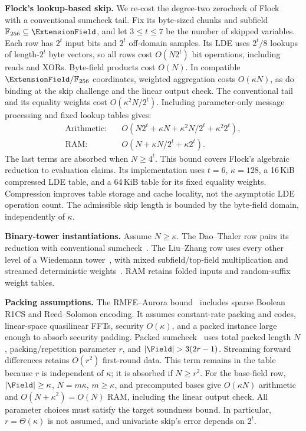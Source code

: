 \smallskip\noindent\textbf{Flock's lookup-based skip.}
We re-cost the degree-two zerocheck of
Flock~\cite[Sections~4.2--4.4]{iacr/BunzRW26} with a conventional
sumcheck tail. Fix its byte-sized chunks and subfield
\(\mathbb F_{256}\subseteq\ExtensionField\), and let
\(3\leq t\leq7\) be the number of skipped variables.
Each row has \(2^t\) input bits and \(2^t\) off-domain samples.
Its LDE uses \(2^t/8\) lookups of length-\(2^t\) byte vectors,
so all rows cost \(O(N2^t)\) bit operations, including reads
and XORs. Byte-field products cost \(O(N)\).
In compatible \(\ExtensionField/\mathbb F_{256}\) coordinates,
weighted aggregation costs \(O(\kappa N)\), as do binding at
the skip challenge and the linear output check.
The conventional tail and its equality weights cost
\(O(\kappa^2N/2^t)\). Including parameter-only message
processing and fixed lookup tables gives:
\begin{equation}
\begin{aligned}
\text{Arithmetic:}\quad&
O\!\left(N2^t+\kappa N+\kappa^2N/2^t+\kappa^2 2^t\right),\\
\text{RAM:}\quad&
O\!\left(N+\kappa N/2^t+\kappa 2^t\right).
\end{aligned}
\label{eq:hadamard-flock-full-cost}
\end{equation}
The last terms are absorbed when \(N\geq4^t\).
This bound covers Flock's algebraic reduction to evaluation claims.
Its implementation uses \(t=6\), \(\kappa=128\),
a 16\,KiB compressed LDE table, and a 64\,KiB table for its
fixed equality weights. Compression improves table storage and
cache locality, not the asymptotic LDE operation count.
The admissible skip length is bounded by the byte-field domain,
independently of \(\kappa\).

\smallskip\noindent\textbf{Binary-tower instantiations.}
Assume \(N\geq\kappa\). The Dao--Thaler row pairs its reduction
with conventional sumcheck~\cite{iacr/DaoT24}.
The Liu--Zhang row uses every other level of a Wiedemann
tower~\cite{iacr/LiuZ25}, with mixed subfield/top-field multiplication
and streamed deterministic weights~\cite{iacr/DaoT24}.
RAM retains folded inputs and random-suffix weight tables.

\smallskip\noindent\textbf{Packing assumptions.}
The RMFE--Aurora bound~\cite{iacr/CascudoG21} includes sparse Boolean
R1CS and Reed--Solomon encoding. It assumes constant-rate packing and
codes, linear-space quasilinear FFTs, security \(O(\kappa)\), and a
packed instance large enough to absorb security padding.
Packed sumcheck~\cite{iacr/WeiWXZDWZ25} uses total packed length \(N\),
packing/repetition parameter \(r\), and \(|\Field|>3(2r-1)\).
Streaming forward differences retains \(O(r^2)\) first-round data.
This term remains in the table because \(r\) is independent of
\(\kappa\); it is absorbed if \(N\geq r^2\).
For the base-field \methodname{} row, \(|\Field|\geq\kappa\),
\(N=m\kappa\), \(m\geq\kappa\), and precomputed
bases give \(O(\kappa N)\) arithmetic and
\(O(N+\kappa^2)=O(N)\) RAM, including the linear output check.
All parameter choices must satisfy the target soundness bound.
In particular, \(r=\Theta(\kappa)\) is not assumed, and univariate
skip's error depends on \(2^t\).

